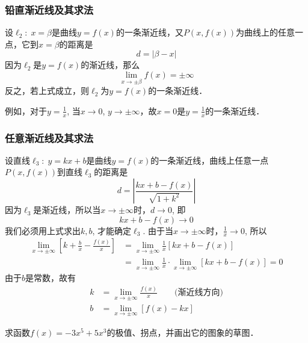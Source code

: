     \subsubsection{铅直渐近线及其求法}
    
    设$\ell_2:\; x=\beta$是曲线$y=f(x)$的一条渐近线，又$P(x,f(x))$为曲线上的任意一点，它到$x=\beta$的距离是
    \[d=|\beta-x|\]
    因为$\ell_2$是$y=f(x)$的渐近线，那么
    \[\lim_{x\to\pm\beta} f (x) =\pm\infty\]
    反之，若上式成立，则$\ell_2$为$y=f(x)$的一条渐近线．
    
    例如，对于$y=\frac{1}{x}$, 当$x\to 0$, $y\to \pm\infty$，故$x=0$是$y=\frac{1}{x}$的一条渐近线．
    
    \subsubsection{任意渐近线及其求法}
    
    设直线$\ell_3:\; y=kx+b$是曲线$y=f(x)$的一条渐近线，曲线上任意一点$P(x,f(x))$到直线$\ell_3$的距离是
    \[d=\left|\frac{kx+b-f(x)}{\sqrt{1+k^2}}\right|\]
    因为$\ell_3$是渐近线，所以当$x\to\pm\infty$时，$d\to 0$, 即
    \[kx+b-f (x) \to 0\]
    我们必须用上式求出$k,b$, 才能确定$\ell_3$. 由于当$x\to\pm\infty$时，$\frac{1}{x}\to 0$, 所以
    \begin{align*}
    \lim_{x\to\pm\infty}\left[k+\frac{b}{x}-\frac{f(x)}{x}\right]&=\lim_{x\to\pm\infty}\frac{1}{x}[kx+b-f(x)]\\
    &=\lim_{x\to\pm\infty}\frac{1}{x}\cdot \lim_{x\to\pm\infty}[kx+b-f(x)]=0
    \end{align*}
    由于$b$是常数，故有
    \begin{align}
        k&=\lim_{x\to\pm\infty}\frac{f(x)}{x}\qquad \text{(渐近线方向)}\\
    b&=\lim_{x\to\pm\infty}[f(x)-kx]
    \end{align}
    
    \begin{example}
    求函数$f(x)=-3x^5+5x^3$的极值、拐点，并画出它的图象的草图．
    \end{example}
    
